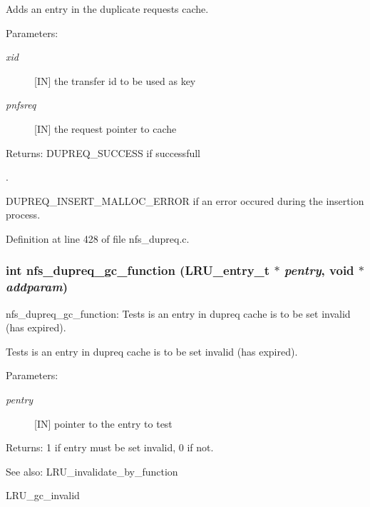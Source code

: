 Adds an entry in the duplicate requests cache.

\begin{Desc}
\item[Parameters:]
\begin{description}
\item[{\em xid}][IN] the transfer id to be used as key \item[{\em pnfsreq}][IN] the request pointer to cache\end{description}
\end{Desc}
\begin{Desc}
\item[Returns:]DUPREQ\_\-SUCCESS if successfull\par
. 

DUPREQ\_\-INSERT\_\-MALLOC\_\-ERROR if an error occured during the insertion process. \end{Desc}


Definition at line 428 of file nfs\_\-dupreq.c.
\subsubsection[{nfs\_\-dupreq\_\-gc\_\-function}]{\setlength{\rightskip}{0pt plus 5cm}int nfs\_\-dupreq\_\-gc\_\-function (LRU\_\-entry\_\-t $\ast$ {\em pentry}, \/  void $\ast$ {\em addparam})}\label{nfs__dupreq_8c_35d644f1f1b2c333ddc223251d615205}


nfs\_\-dupreq\_\-gc\_\-function: Tests is an entry in dupreq cache is to be set invalid (has expired).

Tests is an entry in dupreq cache is to be set invalid (has expired).

\begin{Desc}
\item[Parameters:]
\begin{description}
\item[{\em pentry}][IN] pointer to the entry to test\end{description}
\end{Desc}
\begin{Desc}
\item[Returns:]1 if entry must be set invalid, 0 if not.\end{Desc}
\begin{Desc}
\item[See also:]LRU\_\-invalidate\_\-by\_\-function 

LRU\_\-gc\_\-invalid \end{Desc}


